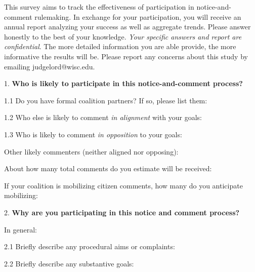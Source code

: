 \documentclass{article}
\begin{document}
This survey aims to track the effectiveness of participation in notice-and-comment rulemaking. In exchange for your participation, you will receive an annual report analyzing your success as well as aggregate trends. Please answer honestly to the best of your knowledge. \textit{Your specific answers and report are confidential}. The more detailed information you are able provide, the more informative the results will be. Please report any concerns about this study by emailing judgelord@wisc.edu.

\doublespace

1. \textbf{Who is likely to participate in this notice-and-comment process?}

1.1 Do you have formal coalition partners? If so, please list them:



1.2 Who else is likely to comment \textit{in alignment} with your goals:


1.3 Who is likely to comment \textit{in opposition} to your goals:


Other likely commenters (neither aligned nor opposing): 


About how many total comments do you estimate will be received:


If your coalition is mobilizing citizen comments, how many do you anticipate mobilizing: 


\bigskip


2. \textbf{Why are you participating in this notice and comment process?}


In general: 


2.1 Briefly describe any procedural aims or complaints:


2.2 Briefly describe any substantive goals:
\end{document}
